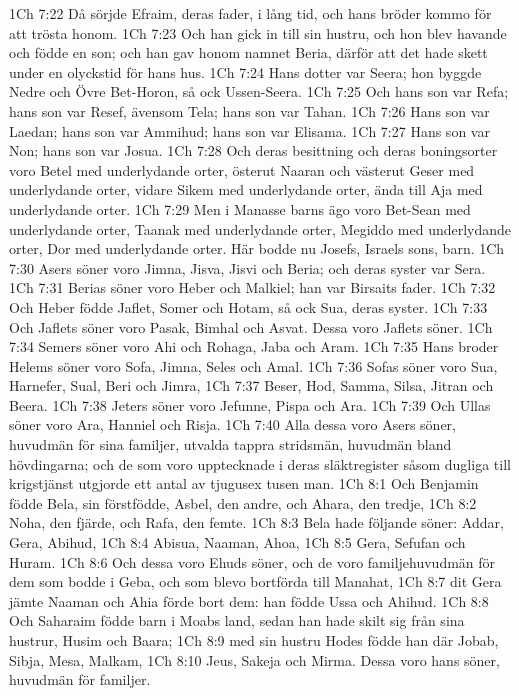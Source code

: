 1Ch 7:22  Då sörjde Efraim, deras fader, i lång tid, och hans bröder kommo för att trösta honom.
1Ch 7:23  Och han gick in till sin hustru, och hon blev havande och födde en son; och han gav honom namnet Beria, därför att det hade skett under en olyckstid för hans hus.
1Ch 7:24  Hans dotter var Seera; hon byggde Nedre och Övre Bet-Horon, så ock Ussen-Seera.
1Ch 7:25  Och hans son var Refa; hans son var Resef, ävensom Tela; hans son var Tahan.
1Ch 7:26  Hans son var Laedan; hans son var Ammihud; hans son var Elisama.
1Ch 7:27  Hans son var Non; hans son var Josua.
1Ch 7:28  Och deras besittning och deras boningsorter voro Betel med underlydande orter, österut Naaran och västerut Geser med underlydande orter, vidare Sikem med underlydande orter, ända till Aja med underlydande orter.
1Ch 7:29  Men i Manasse barns ägo voro Bet-Sean med underlydande orter, Taanak med underlydande orter, Megiddo med underlydande orter, Dor med underlydande orter. Här bodde nu Josefs, Israels sons, barn.
1Ch 7:30  Asers söner voro Jimna, Jisva, Jisvi och Beria; och deras syster var Sera.
1Ch 7:31  Berias söner voro Heber och Malkiel; han var Birsaits fader.
1Ch 7:32  Och Heber födde Jaflet, Somer och Hotam, så ock Sua, deras syster.
1Ch 7:33  Och Jaflets söner voro Pasak, Bimhal och Asvat. Dessa voro Jaflets söner.
1Ch 7:34  Semers söner voro Ahi och Rohaga, Jaba och Aram.
1Ch 7:35  Hans broder Helems söner voro Sofa, Jimna, Seles och Amal.
1Ch 7:36  Sofas söner voro Sua, Harnefer, Sual, Beri och Jimra,
1Ch 7:37  Beser, Hod, Samma, Silsa, Jitran och Beera.
1Ch 7:38  Jeters söner voro Jefunne, Pispa och Ara.
1Ch 7:39  Och Ullas söner voro Ara, Hanniel och Risja.
1Ch 7:40  Alla dessa voro Asers söner, huvudmän för sina familjer, utvalda tappra stridsmän, huvudmän bland hövdingarna; och de som voro upptecknade i deras släktregister såsom dugliga till krigstjänst utgjorde ett antal av tjugusex tusen man.
1Ch 8:1  Och Benjamin födde Bela, sin förstfödde, Asbel, den andre, och Ahara, den tredje,
1Ch 8:2  Noha, den fjärde, och Rafa, den femte.
1Ch 8:3  Bela hade följande söner: Addar, Gera, Abihud,
1Ch 8:4  Abisua, Naaman, Ahoa,
1Ch 8:5  Gera, Sefufan och Huram.
1Ch 8:6  Och dessa voro Ehuds söner, och de voro familjehuvudmän för dem som bodde i Geba, och som blevo bortförda till Manahat,
1Ch 8:7  dit Gera jämte Naaman och Ahia förde bort dem: han födde Ussa och Ahihud.
1Ch 8:8  Och Saharaim födde barn i Moabs land, sedan han hade skilt sig från sina hustrur, Husim och Baara;
1Ch 8:9  med sin hustru Hodes födde han där Jobab, Sibja, Mesa, Malkam,
1Ch 8:10  Jeus, Sakeja och Mirma. Dessa voro hans söner, huvudmän för familjer.
